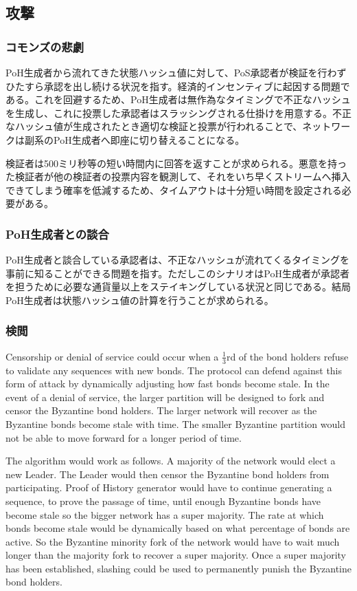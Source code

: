 \documentclass[12pt]{ltjsarticle}
\begin{document}
\subsection{攻撃}
\subsubsection{コモンズの悲劇}
PoH生成者から流れてきた状態ハッシュ値に対して、PoS承認者が検証を行わずひたすら承認を出し続ける状況を指す。経済的インセンティブに起因する問題である。これを回避するため、PoH生成者は無作為なタイミングで不正なハッシュを生成し、これに投票した承認者はスラッシングされる仕掛けを用意する。不正なハッシュ値が生成されたとき適切な検証と投票が行われることで、ネットワークは副系のPoH生成者へ即座に切り替えることになる。

検証者は500ミリ秒等の短い時間内に回答を返すことが求められる。悪意を持った検証者が他の検証者の投票内容を観測して、それをいち早くストリームへ挿入できてしまう確率を低減するため、タイムアウトは十分短い時間を設定される必要がある。

\subsubsection{PoH生成者との談合}\label{subsubsec:collusion}
PoH生成者と談合している承認者は、不正なハッシュが流れてくるタイミングを事前に知ることができる問題を指す。ただしこのシナリオはPoH生成者が承認者を担うために必要な通貨量以上をステイキングしている状況と同じである。結局PoH生成者は状態ハッシュ値の計算を行うことが求められる。

\subsubsection{検閲}\label{censorship}
Censorship or denial of service could occur when a \(\frac{1}{3}\)rd of the bond holders refuse to validate any sequences with new bonds. The protocol can defend against this form of attack by dynamically adjusting how fast bonds become stale. In the event of a denial of service, the larger partition will be designed to fork and censor the Byzantine bond holders. The larger network will recover as the Byzantine bonds become stale with time. The smaller Byzantine partition would not be able to move forward for a longer period of time.

The algorithm would work as follows. A majority of the network would elect a new Leader. The Leader would then censor the Byzantine bond holders from participating. Proof of History generator would have to continue generating a sequence, to prove the passage of time, until enough Byzantine bonds have become stale so the bigger network has a super majority. The rate at which bonds become stale would be dynamically based on what percentage of bonds are active. So the Byzantine minority fork of the network would have to wait much longer than the majority fork to recover a super majority. Once a super majority has been established, slashing could be used to permanently punish the Byzantine bond holders.
\end{document}
